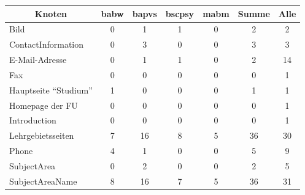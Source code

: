    \begin{table}[htb]
        \centering
        \begin{tabular}{|l|c|c|c|c|c|c|}
            \hline
            \multicolumn{1}{|c|}{\textbf{Knoten}} & \textbf{\gls{babw}} & \textbf{\gls{bapvs}} & \textbf{\gls{bscpsy}} & \textbf{\gls{mabm}} & \textbf{Summe} & \textbf{Alle} \\ \hline
            Bild                                  & 0             & 1              & 1               & 0             & 2              & 2             \\ \hline
            ContactInformation                    & 0             & 3              & 0               & 0             & 3              & 3             \\ \hline
            E-Mail-Adresse                        & 0             & 1              & 1               & 0             & 2              & 14            \\ \hline
            Fax                                   & 0             & 0              & 0               & 0             & 0              & 1             \\ \hline
            Hauptseite "`Studium"'                & 1             & 0              & 0               & 0             & 1              & 1             \\ \hline
            Homepage der FU                       & 0             & 0              & 0               & 0             & 0              & 1             \\ \hline
            Introduction                          & 0             & 0              & 0               & 0             & 0              & 1             \\ \hline
            Lehrgebietsseiten                     & 7             & 16             & 8               & 5             & 36             & 30            \\ \hline
            Phone                                 & 4             & 1              & 0               & 0             & 5              & 9             \\ \hline
            SubjectArea                           & 0             & 2              & 0               & 0             & 2              & 5             \\ \hline
            SubjectAreaName                       & 8             & 16             & 7               & 5             & 36             & 31            \\ \hline

\end{tabular}
\end{table}
